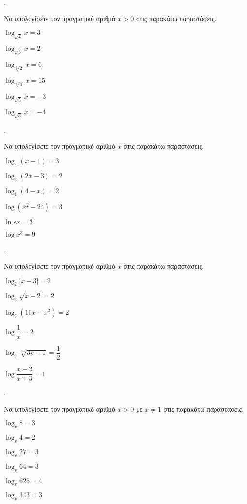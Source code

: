 \documentclass[11pt,a4paper,twocolumn]{article}
\newcounter{askhsh}
\newcommand{\askhsh}{{\large\theaskhsh.}\ \addtocounter{askhsh}{1}}
\begin{document}
\askhsh Να υπολογίσετε τον πραγματικό αριθμό $ x>0 $ στις παρακάτω παραστάσεις.
\begin{multicols}{2}
\begin{alist}
\item $ \log_{\sqrt{2}}{x}=3 $
\item $ \log_{\sqrt{3}}{x}=2 $
\item $ \log_{\sqrt[3]{2}}{x}=6 $
\item $ \log_{\sqrt[5]{4}}{x}=15 $
\item $ \log_{\sqrt{5}}{x}=-3 $
\item $ \log_{\sqrt{3}}{x}=-4 $
\end{alist}
\end{multicols}
\askhsh Να υπολογίσετε τον πραγματικό αριθμό $ x $ στις παρακάτω παραστάσεις.
\begin{multicols}{2}
\begin{alist}
\item $ \log_{2}{(x-1)}=3 $
\item $ \log_{3}{(2x-3)}=2 $
\item $ \log_{4}{(4-x)}=2 $
\item $ \log{\left( x^2-24\right) }=3 $
\item $ \ln{ex}=2 $
\item $ \log{x^3}=9 $
\end{alist}
\end{multicols}
\askhsh Να υπολογίσετε τον πραγματικό αριθμό $ x $ στις παρακάτω παραστάσεις.
\begin{multicols}{2}
\begin{alist}[leftmargin=4mm]
\item $ \log_{2}{|x-3|}=2 $
\item $ \log_{3}{\sqrt{x-2}}=2 $
\item $ \log_{5}{\left(10x-x^2\right) }=2 $
\item $ \log{\dfrac{1}{x}}=2 $
\item $ \log_{9}{\sqrt[3]{3x-1}}=\dfrac{1}{2} $
\item $ \log{\dfrac{x-2}{x+3}}=1 $
\end{alist}
\end{multicols}
\askhsh Να υπολογίσετε τον πραγματικό αριθμό $ x>0$ με $ x\neq 1 $ στις παρακάτω παραστάσεις.
\begin{multicols}{2}
\begin{alist}
\item $ \log_{x}{8}=3 $
\item $ \log_{x}{4}=2 $
\item $ \log_{x}{27}=3 $
\item $ \log_{x}{64}=3 $
\item $ \log_{x}{625}=4 $
\item $ \log_{x}{343}=3 $
\end{alist}
\end{multicols}
\end{document}
